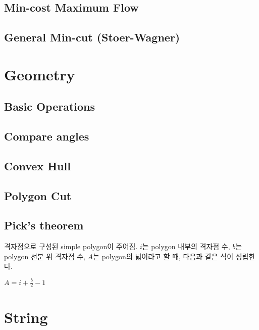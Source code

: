\documentclass[10pt,landscape,a4paper,twocolumn]{article}
\begin{document}
\subsection{Min-cost Maximum Flow}


\subsection{General Min-cut (Stoer-Wagner)}


\section{Geometry}

\subsection{Basic Operations}


\subsection{Compare angles}

\subsection{Convex Hull}


\subsection{Polygon Cut}


\subsection{Pick's theorem}

격자점으로 구성된 simple polygon이 주어짐. $i$는 polygon 내부의 격자점 수, $b$는 polygon 선분 위 격자점 수, $A$는 polygon의 넓이라고 할 때, 다음과 같은 식이 성립한다.

$A = i + \frac{b}{2} - 1$

\section{String}
\end{document}
